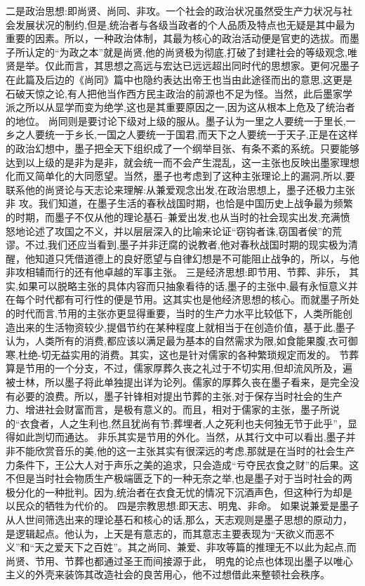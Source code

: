 \documentclass[12pt,UTF8]{ctexbook}
\begin{document}
二是政治思想:即尚贤、尚同、非攻。一个社会的政治状况虽然受生产力状况与社会发展状况的制约,但是,统治者与各级当政者的个人品质及特点也无疑是其中最为重要的因素。所以，一种政治体制，其最为核心的政治活动便是官吏的选拔。而墨子所认定的“为政之本”就是尚贤,他的尚贤极为彻底,打破了封建社会的等级观念,唯贤是举。仅此而言，其思想之高远与宏达已远远超出同时代的思想家。更何况墨子在此篇及后边的《尚同》篇中也隐约表达出帝王也当由此途径而出的意思,这更是石破天惊之论,有人把他当作西方民主政治的前源也不足为怪。当然，此后墨家学派之所以从显学而变为绝学,这也是其重要原因之一,因为这从根本上危及了统治者的地位。
尚同则是要讨论下级对上级的服从。墨子认为一里之人要统一于里长,一乡之人要统一于乡长,一国之人要统一于国君,而天下之人要统一于天子,正是在这样的政治幻想中，墨子把全天下组织成了一个纲举目张、有条不紊的系统。只要能够达到以上级的是非为是非，就会统一而不会产生混乱，这一主张也反映出墨家理想化而又简单化的大同愿望。当然，墨子也考虑到了这种主张理论上的漏洞,所以,要联系他的尚贤论与天志论来理解:从兼爱观念出发,在政治思想上，墨子还极力主张非
攻。我们知道，在墨子生活的春秋战国时期，也恰是中国历史上战争最为频繁的时期，而墨子不仅从他的理论基石--兼爱出发,也从当时的社会现实出发,充满愤怒地论述了攻国之不义，并以层层深入的比喻来论证“窃钩者诛,窃国者侯”的荒谬。不过,我们还应当看到,墨子并非迂腐的说教者,他对春秋战国时期的现实极为清醒，他知道只凭借道德上的良好愿望与自律幻想是不可能阻止战争的，所以，与他非攻相辅而行的还有他卓越的军事主张。
三是经济思想:即节用、节葬、非乐，
其实,如果可以脱略主张的具体内容而只抽象看待的话,墨子的主张中,最有永恒意义并在每个时代都有可行性的便是节用。这其实也是他经济思想的核心。而就墨子所处的时代而言,节用的主张亦更显得重要，当时的生产力水平比较低下，人类所能创造出来的生活物资较少,提倡节约在某种程度上就相当于在创造价值，基于此,墨子认为，人类所有的消费,都应该以满足最为基本的自然需求为限,如食能果腹,衣可御寒,杜绝-切无益实用的消费。其实，这也是针对儒家的各种繁琐规定而发的。
节葬算是节用的一个分支，不过，儒家厚葬久丧之礼过于不切实用,但却流风所及，遍被士林，所以墨子将此单独提出详为论列。儒家的厚葬久丧在墨子看来，是完全没有必要的浪费。所以，墨子针锋相对提出节葬的主张,对于保存当时社会的生产力、增进社会财富而言，是极有意义的。而且，相对于儒家的主张，墨子所说的“衣食者，人之生利也,然且犹尚有节;葬埋者,人之死利也夫何独无节于此乎”，显得如此剀切而通达。
非乐其实是节用的外化。当然，从其行文中可以看出,墨子并非不能欣赏音乐的美,他的这一主张其实有很深远的考虑,那就是在当时的社会生产力条件下，王公大人对于声乐之美的追求，只会造成“亏夺民衣食之财”的后果。这不但是当时社会物质生产极端匮乏下的一种无奈之举,也是墨子对于当时社会的两极分化的一种批判。因为,统治者在衣食无忧的情况下沉酒声色，但这种行为却是以民众的牺牲为代价的。
四是宗教思想:即天志、明鬼、非命。
如果说兼爱是墨子从人世间筛选出来的理论基石和核心的话,那么，天志观则是墨子思想的原动力，是逻辑起点。他认为，上天是有意志的，而其意志主要表现为“天欲义而恶不义”和“天之爱天下之百姓”。其之尚同、兼爱、非攻等篇的推理无不以此为起点,而尚贤、节用、节葬也都通过圣王而间接源于此，
明鬼的论点也体现出墨子以唯心主义的外壳来装饰其改造社会的良苦用心，他不过想借此来整顿社会秩序。
\end{document}
